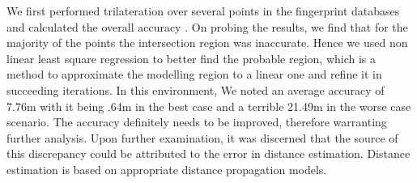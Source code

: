 \documentclass[twocolumn, 11pt]{IEEEtran}
\begin{document}
We first performed trilateration over several points in the fingerprint databases and calculated the overall accuracy \cite{shanmugaapriyan2014pragmatic}. On probing the results, we find that for the majority of the points the intersection region was inaccurate. Hence we used non linear least square regression to better find the probable region, which is a method to approximate the modelling region to a linear one and refine it in succeeding iterations. In this environment, We noted an average accuracy of 7.76m with it being .64m in the best case and a terrible 21.49m in the worse case scenario. 
The accuracy definitely needs to be improved, therefore warranting further analysis. Upon further examination, it was discerned that the source of this discrepancy could be attributed to the error in distance estimation. Distance estimation is based on appropriate distance propagation models.





\end{document}
